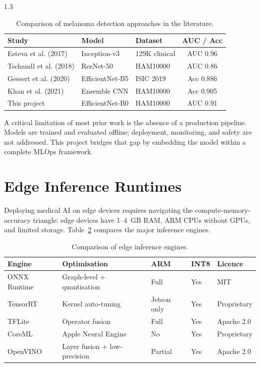 \begin{spacing}{1.3}
\begin{table}[H]
\centering
\caption{Comparison of melanoma detection approaches in the literature.}
\label{tab:related}
\begin{tabular}{lllc}
\toprule
\textbf{Study} & \textbf{Model} & \textbf{Dataset} & \textbf{AUC / Acc} \\
\midrule
Esteva et al. (2017)  & Inception-v3  & 129K clinical   & AUC 0.96 \\
Tschandl et al. (2018)& ResNet-50     & HAM10000        & AUC 0.86 \\
Gessert et al. (2020) & EfficientNet-B5 & ISIC 2019     & Acc 0.886 \\
Khan et al. (2021)    & Ensemble CNN  & HAM10000        & Acc 0.905 \\
This project          & EfficientNet-B0 & HAM10000      & AUC 0.91 \\
\bottomrule
\end{tabular}
\end{table}

A critical limitation of most prior work is the absence of a production pipeline. Models are trained and evaluated offline; deployment, monitoring, and safety are not addressed. This project bridges that gap by embedding the model within a complete MLOps framework.

\section{Edge Inference Runtimes}

Deploying medical AI on edge devices requires navigating the compute-memory-accuracy triangle: edge devices have 1--4~GB RAM, ARM CPUs without GPUs, and limited storage. Table~\ref{tab:engines} compares the major inference engines.

\begin{table}[H]
\centering
\caption{Comparison of edge inference engines.}
\label{tab:engines}
\begin{tabular}{llllp{2.2cm}}
\toprule
\textbf{Engine} & \textbf{Optimisation} & \textbf{ARM} & \textbf{INT8} & \textbf{Licence} \\
\midrule
ONNX Runtime & Graph-level + quantisation & Full & Yes & MIT \\
TensorRT     & Kernel auto-tuning          & Jetson only & Yes & Proprietary \\
TFLite       & Operator fusion             & Full & Yes & Apache 2.0 \\
CoreML       & Apple Neural Engine         & No & Yes & Proprietary \\
OpenVINO     & Layer fusion + low-precision & Partial & Yes & Apache 2.0 \\
\bottomrule
\end{tabular}
\end{table}


\end{spacing}
